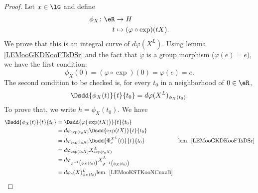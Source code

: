 \begin{proof}
	Let \( x\in\lG\) and define
	\begin{equation}
		\begin{aligned}
			\phi_X\colon \eR & \to H                            \\
			t                & \mapsto (\varphi\circ \exp)(tX).
		\end{aligned}
	\end{equation}
	We prove that this is an integral curve of \( d\varphi(X^L)\). Using lemma \ref{LEMooGKDKooFTsDSr} and the fact that \( \varphi\) is a group morphism (\( \varphi(e)=e\)), we have the first condition:
	\begin{equation}
		\phi_X(0)=(\varphi\circ\exp)(0)=\varphi(e)=e.
	\end{equation}
	The second condition to be checked is, for every \( t_0\) in a neighborhood of \( 0\in \eR\),
	\begin{equation}
		\Dsdd{ \phi_X(t) }{t}{t_0}=d\varphi(X^L)_{\phi_X(t_0)}.
	\end{equation}
	To prove that, we write \( h=\phi_X(t_0)\). We have
	\begin{subequations}
		\begin{align}
			\Dsdd{ \phi_X(t) }{t}{t_0} & =\Dsdd{ \varphi\big( \exp(tX) \big) }{t}{t_0}                                                                                                                \\
			                           & =d\varphi_{\exp(t_0X)}\Dsdd{  \exp(tX) }{t}{t_0}                                                                                                             \\
			                           & =d\varphi_{\exp(t_0X)}\Dsdd{ \Phi_e^{X^L}(t) }{t}{t_0}                                                                 & \text{lem. \ref{LEMooGKDKooFTsDSr}} \\
			                           & =d\varphi_{\exp(t_0X)}X^{L}_{\exp(t_0X)}       \label{SUBEQooDKLLooSMJbVf}                                                                                   \\
			                           & =d\varphi_{\varphi^{-1}\big( \phi_X(t_0) \big)}X^L_{\varphi^{-1}\big( \phi_X(t_0) \big)}   \label{SUBEQooPKFUooNwMkeC}                                       \\
			                           & =d\varphi_e(X)^L_{\phi_X(t_0)}     \text{lem. \ref{LEMooKSTKooNCnxzB}}
		\end{align}
	\end{subequations}

\end{proof}
